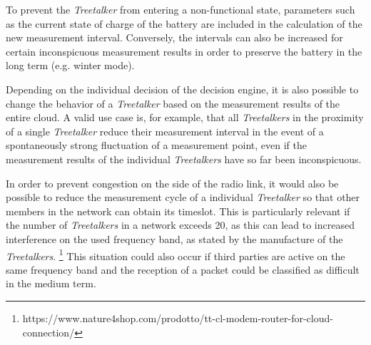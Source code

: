 To prevent the \textit{Treetalker} from entering a non-functional state, parameters such as the current state of charge of the battery are included in the calculation of the new measurement interval.
Conversely, the intervals can also be increased for certain inconspicuous measurement results in order to preserve the battery in the long term (e.g. winter mode). 

Depending on the individual decision of the decision engine, it is also possible to change the behavior of a \textit{Treetalker} based on the measurement results of the entire cloud. 
A valid use case is, for example, that all \textit{Treetalkers} in the proximity of a single \textit{Treetalker} reduce their measurement interval in the event of a spontaneously strong fluctuation of a measurement point, even if the measurement results of the individual \textit{Treetalkers} have so far been inconspicuous. 

In order to prevent congestion on the side of the radio link, it would also be possible to reduce the measurement cycle of a individual \textit{Treetalker} so that other members in the network can obtain its timeslot. 
This is particularly relevant if the number of \textit{Treetalkers} in a network exceeds 20, as this can lead to increased interference on the used frequency band, as stated by the manufacture of the \textit{Treetalkers}. \footnote{https://www.nature4shop.com/prodotto/tt-cl-modem-router-for-cloud-connection/}
This situation could also occur if third parties are active on the same frequency band and the reception of a packet could be classified as difficult in the medium term. 